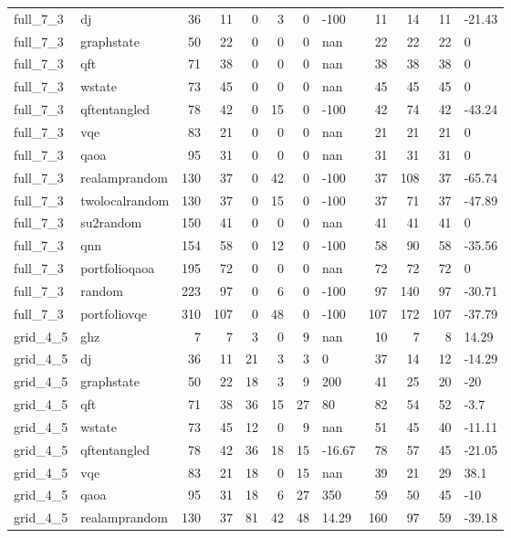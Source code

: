 \begin{longtable}{llrrrrrlrrrl}
full\_7\_3 & dj & 36 & 11 & 0 & 3 & 0 & -100 & 11 & 14 & 11 & -21.43 \\
full\_7\_3 & graphstate & 50 & 22 & 0 & 0 & 0 & nan & 22 & 22 & 22 & 0 \\
full\_7\_3 & qft & 71 & 38 & 0 & 0 & 0 & nan & 38 & 38 & 38 & 0 \\
full\_7\_3 & wstate & 73 & 45 & 0 & 0 & 0 & nan & 45 & 45 & 45 & 0 \\
full\_7\_3 & qftentangled & 78 & 42 & 0 & 15 & 0 & -100 & 42 & 74 & 42 & -43.24 \\
full\_7\_3 & vqe & 83 & 21 & 0 & 0 & 0 & nan & 21 & 21 & 21 & 0 \\
full\_7\_3 & qaoa & 95 & 31 & 0 & 0 & 0 & nan & 31 & 31 & 31 & 0 \\
full\_7\_3 & realamprandom & 130 & 37 & 0 & 42 & 0 & -100 & 37 & 108 & 37 & -65.74 \\
full\_7\_3 & twolocalrandom & 130 & 37 & 0 & 15 & 0 & -100 & 37 & 71 & 37 & -47.89 \\
full\_7\_3 & su2random & 150 & 41 & 0 & 0 & 0 & nan & 41 & 41 & 41 & 0 \\
full\_7\_3 & qnn & 154 & 58 & 0 & 12 & 0 & -100 & 58 & 90 & 58 & -35.56 \\
full\_7\_3 & portfolioqaoa & 195 & 72 & 0 & 0 & 0 & nan & 72 & 72 & 72 & 0 \\
full\_7\_3 & random & 223 & 97 & 0 & 6 & 0 & -100 & 97 & 140 & 97 & -30.71 \\
full\_7\_3 & portfoliovqe & 310 & 107 & 0 & 48 & 0 & -100 & 107 & 172 & 107 & -37.79 \\
grid\_4\_5 & ghz & 7 & 7 & 3 & 0 & 9 & nan & 10 & 7 & 8 & 14.29 \\
grid\_4\_5 & dj & 36 & 11 & 21 & 3 & 3 & 0 & 37 & 14 & 12 & -14.29 \\
grid\_4\_5 & graphstate & 50 & 22 & 18 & 3 & 9 & 200 & 41 & 25 & 20 & -20 \\
grid\_4\_5 & qft & 71 & 38 & 36 & 15 & 27 & 80 & 82 & 54 & 52 & -3.7 \\
grid\_4\_5 & wstate & 73 & 45 & 12 & 0 & 9 & nan & 51 & 45 & 40 & -11.11 \\
grid\_4\_5 & qftentangled & 78 & 42 & 36 & 18 & 15 & -16.67 & 78 & 57 & 45 & -21.05 \\
grid\_4\_5 & vqe & 83 & 21 & 18 & 0 & 15 & nan & 39 & 21 & 29 & 38.1 \\
grid\_4\_5 & qaoa & 95 & 31 & 18 & 6 & 27 & 350 & 59 & 50 & 45 & -10 \\
grid\_4\_5 & realamprandom & 130 & 37 & 81 & 42 & 48 & 14.29 & 160 & 97 & 59 & -39.18 \\

\end{longtable}
